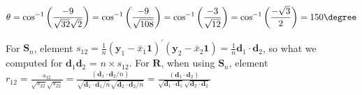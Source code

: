 \begin{enumerate}[label=(\alph*)]
\[        \theta
        =
        {\cos}^{-1}\left(\frac{-9}{\sqrt{32}\sqrt{2}}\right)
        =
        {\cos}^{-1}\left(\frac{-9}{\sqrt{108}}\right)
        =
        {\cos}^{-1}\left(\frac{-3}{\sqrt{12}}\right)
        =
        {\cos}^{-1}\left(\frac{-\sqrt{3}}{2}\right)
        =
        150\degree
    \]
    \par
    For $\textbf{S}_n$, element $s_{12} = \frac{1}{n}{\left(\textbf{y}_1 - \bar{x}_1\textbf{1}\right)}^\prime{\left(\textbf{y}_2 - \bar{x}_2\textbf{1}\right)} = \frac{1}{n}\textbf{d}_1\cdot\textbf{d}_2$, so what we computed for $\textbf{d}_1\textbf{d}_2$ = $n\times s_{12}$. For $\textbf{R}$, when using $\textbf{S}_n$, element $r_{12} = \frac{s_{12}}{\sqrt{s_{22}}\sqrt{s_{22}}} = \frac{(\textbf{d}_1\cdot\textbf{d}_2/n)}{\sqrt{\textbf{d}_1\cdot\textbf{d}_1/n}\sqrt{\textbf{d}_2\cdot\textbf{d}_2/n}} = \frac{(\textbf{d}_1\cdot\textbf{d}_2)}{\sqrt{\textbf{d}_1\cdot\textbf{d}_1}\sqrt{\textbf{d}_2\cdot\textbf{d}_2}}$
\end{enumerate}
